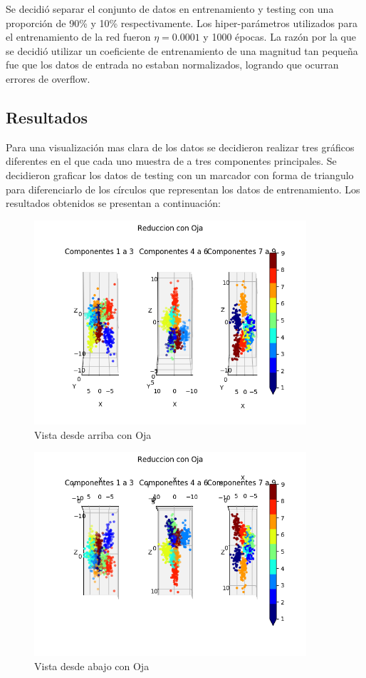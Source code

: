Se decidió separar el conjunto de datos en entrenamiento y testing con una
proporción de 90\% y 10\% respectivamente. Los hiper-parámetros utilizados para
el entrenamiento de la red fueron $\eta = 0.0001$ y 1000 épocas. La razón por
la que se decidió utilizar un coeficiente de entrenamiento de una magnitud tan
pequeña fue que los datos de entrada no estaban normalizados, logrando que
ocurran errores de overflow.

\subsection{Resultados}
Para una visualización mas clara de los datos se decidieron realizar tres
gráficos diferentes en el que cada uno muestra de a tres componentes
principales. Se decidieron graficar los datos de testing con un marcador con
forma de triangulo para diferenciarlo de los círculos que representan los datos
de entrenamiento. Los resultados obtenidos se presentan a continuación:


\begin{figure}[H]
  \includegraphics[width=0.9\textwidth]{imagenes/componentes_oja_1.png}
  \caption{Vista desde arriba con Oja}
\end{figure}

\begin{figure}[H]
  \includegraphics[width=0.9\textwidth]{imagenes/componentes_oja_2.png}
  \caption{Vista desde abajo con Oja}
\end{figure}

